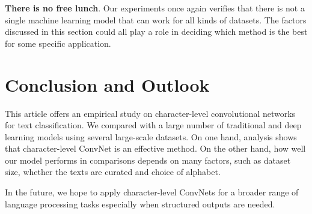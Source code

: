 \textbf{There is no free lunch}. Our experiments once again verifies that there is not a single machine learning model that can work for all kinds of datasets. The factors discussed in this section could all play a role in deciding which method is the best for some specific application.

\section{Conclusion and Outlook}

This article offers an empirical study on character-level convolutional networks for text classification. We compared with a large number of traditional and deep learning models using several large-scale datasets. On one hand, analysis shows that character-level ConvNet is an effective method. On the other hand, how well our model performs in comparisons depends on many factors, such as dataset size, whether the texts are curated and choice of alphabet.

In the future, we hope to apply character-level ConvNets for a broader range of language processing tasks especially when structured outputs are needed.


